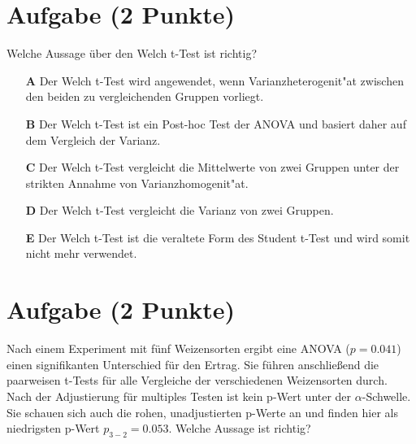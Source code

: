 \documentclass[a4paper, 10pt]{scrartcl}\usepackage[]{graphicx}\usepackage[]{color}
\begin{document}
\section{Aufgabe \hfill (2 Punkte)}

Welche Aussage {\"u}ber den Welch t-Test ist richtig?



\begin{enumerate}
\item [\textbf{A} \msquare] Der Welch t-Test wird angewendet, wenn Varianzheterogenit{"a}t zwischen den beiden zu vergleichenden Gruppen vorliegt.
\item [\textbf{B} \msquare] Der Welch t-Test ist ein Post-hoc Test der ANOVA und basiert daher auf dem Vergleich der Varianz.
\item [\textbf{C} \msquare] Der Welch t-Test vergleicht die Mittelwerte von zwei Gruppen unter der strikten Annahme von Varianzhomogenit{"a}t.
\item [\textbf{D} \msquare] Der Welch t-Test vergleicht die Varianz von zwei Gruppen.
\item [\textbf{E} \msquare] Der Welch t-Test ist die veraltete Form des Student t-Test und wird somit nicht mehr verwendet.
\end{enumerate}  

\section{Aufgabe \hfill (2 Punkte)}

Nach einem Experiment mit f{\"u}nf Weizensorten ergibt eine ANOVA ($p = 0.041$)
einen signifikanten Unterschied f{\"u}r den Ertrag. Sie f{\"u}hren anschlie{\ss}end die
paarweisen t-Tests f{\"u}r alle Vergleiche der verschiedenen Weizensorten
durch. Nach der Adjustierung f{\"u}r multiples Testen ist kein p-Wert unter der
$\alpha$-Schwelle. Sie schauen sich auch die rohen, unadjustierten p-Werte
an und finden hier als niedrigsten p-Wert $p_{3-2} = 0.053$. Welche Aussage
ist richtig? 
\end{document}
